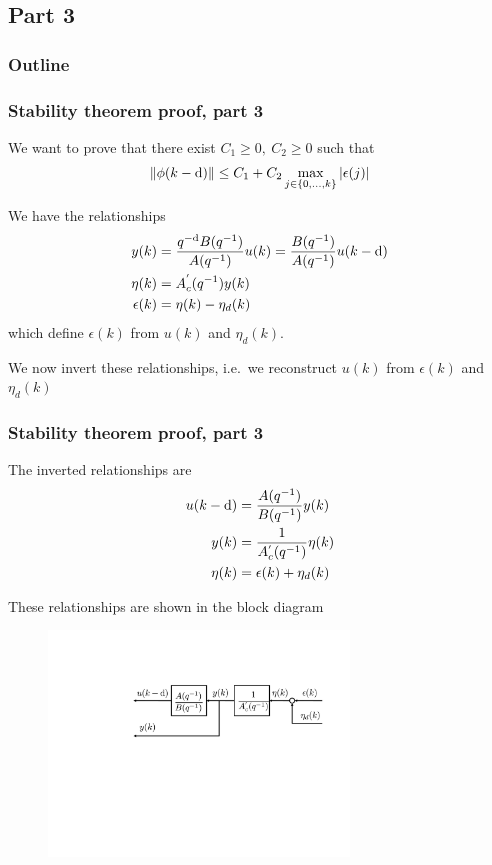 \subsection{Part 3}
\begin{frame}
    \frametitle{Outline}
    \tableofcontents[currentsection]
\end{frame}

\begin{frame}
    \frametitle{Stability theorem proof, part 3}

    We want to prove that there exist $C_1 \geq 0, \ C_2 \geq 0$ such that
    \begin{align*}
        \| \phi(k-\textrm{d}) \| \leq C_1 + C_2 \max_{j \in \{0,\ldots,k\}} |\epsilon(j)|
    \end{align*}
    \paused
    
    We have the relationships
    \begin{align*}
        y(k) & = \frac{ q^{-\textrm{d}} B(q^{-1}) }{ A(q^{-1}) } u(k) = \frac{ B(q^{-1}) }{ A(q^{-1}) } u(k-\textrm{d}) \\
        \eta(k) & = A_c^{'}(q^{-1}) y(k) \\
        \epsilon(k) & = \eta(k) - \eta_d(k)
    \end{align*}
    which define $\epsilon(k)$ from $u(k)$ and $\eta_d(k)$.
    \pause
    
    We now invert these relationships, i.e.\ we reconstruct $u(k)$ from $\epsilon(k)$ and $\eta_d(k)$
\end{frame}

\begin{frame}
    \frametitle{Stability theorem proof, part 3}
        
    The inverted relationships are
    \begin{align*}
        u(k-\textrm{d}) & = \frac{ A(q^{-1}) }{ B(q^{-1}) } y(k) \\
        y(k) & = \frac{1}{ A_c^{'}(q^{-1}) } \eta(k) \\
        \eta(k) & = \epsilon(k) + \eta_d(k)
    \end{align*}
    \paused

    These relationships are shown in the block diagram
    \begin{figure}
        \includegraphics[width=8cm]{figs_bounded}\\
    \end{figure}
    
\end{frame}

